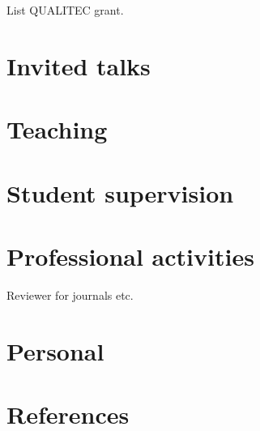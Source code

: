 \documentclass[12pt]{article}
\begin{document}
List QUALITEC grant.

\section*{Invited talks}

\section*{Teaching}

\section*{Student supervision}

\section*{Professional activities}

Reviewer for journals etc.

\section*{Personal}

\section*{References}
\end{document}
